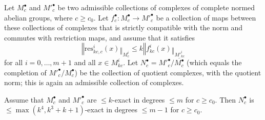 \begin{proposition}
  \label{snakelemma}
  Let $M^\bullet_c$ and $M'^\bullet_c$ be two admissible collections
  of complexes of complete normed abelian groups, where $c\geq c_0$.
  Let $f^\bullet_c: M^\bullet_c\to M'^\bullet_c$ be a collection of maps
  between these collections of complexes
  that is strictly compatible with the norm and commutes with restriction maps,
  and assume that it satisfies
  \[
  ‖\mathrm{res}^i_{kc,c}(x)‖_{M^i_c}\leq k‖f^i_{kc}(x)‖_{M'^i_{kc}}
  \]
  for all $i=0,\ldots,m+1$ and all $x\in M^i_{kc}$.
  Let $N^\bullet_c=M'^\bullet_c/\overline{M^\bullet_c}$
  (which equals the completion of $M'^{\bullet}_c/M^\bullet_c$)
  be the collection of quotient complexes, with the quotient norm;
  this is again an admissible collection of complexes.

  Assume that $M^\bullet_c$ and $M'^\bullet_c$ are $\leq k$-exact in degrees $\leq m$ for $c\geq c_0$.
  Then $N^\bullet_c$ is $\leq \max(k^4,k^3+k+1)$-exact in degrees $\leq m-1$ for $c\geq c_0$.
\end{proposition}

